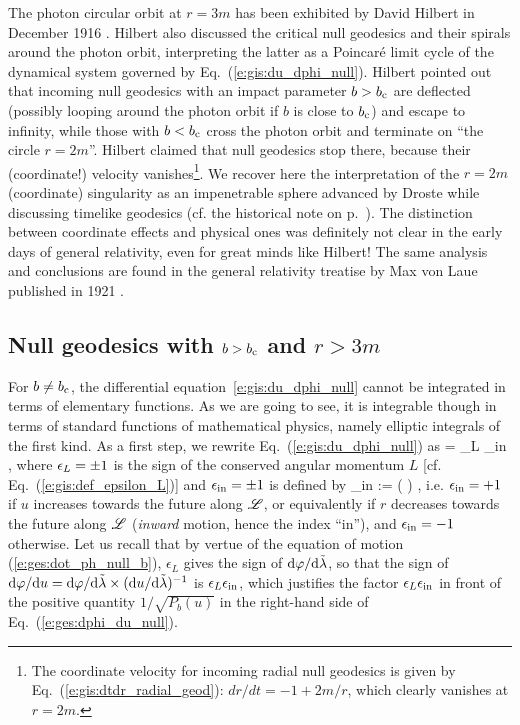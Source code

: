 \begin{hist}
The photon circular orbit at $r=3m$ has been exhibited by David Hilbert
in December 1916 \cite{Hilbe1917a,Hilbe1917b}. Hilbert also discussed the
critical null geodesics and their spirals
around the photon orbit, interpreting the latter as a Poincaré limit cycle
of the dynamical system governed by Eq.~(\ref{e:gis:du_dphi_null}).
Hilbert pointed out that incoming null geodesics with an impact parameter
$b > b_{\rm c}$ are deflected (possibly looping
around the photon orbit if $b$ is close to $b_{\rm c}$) and escape to infinity,
while those with $b < b_{\rm c}$ cross the photon orbit and terminate on ``the circle
$r=2m$''. Hilbert claimed that null geodesics stop there, because
their (coordinate!) velocity vanishes\footnote{The coordinate velocity for
incoming radial null geodesics is given by Eq.~(\ref{e:gis:dtdr_radial_geod}):
$dr/dt = - 1 + 2m/r$, which clearly vanishes at $r=2m$.}. We recover here the interpretation
of the $r=2m$ (coordinate) singularity as an impenetrable sphere advanced by Droste while discussing
timelike geodesics (cf. the historical note on p.~\pageref{h:ges:geod}). The distinction
between coordinate effects and physical ones was definitely not clear in the early
days of general relativity, even for great minds like Hilbert!
The same analysis and conclusions are found in the general relativity treatise
by Max von Laue published in 1921 \cite{Laue1921}.
\end{hist}

\subsection{Null geodesics with $b > b_{\rm c}$ and $r> 3m$} \label{s:gis:geod_b_gt_bc_out}

For $b \not= b_{\rm c}$, the differential equation~\eqref{e:gis:du_dphi_null} cannot be integrated
in terms of elementary functions. As we are going to see, it is integrable
though in terms of standard
functions of mathematical physics, namely elliptic integrals of the first kind.
As a first step, we rewrite Eq.~(\ref{e:gis:du_dphi_null}) as
\be \label{e:ges:dphi_du_null}
    = \eps_L \eps_{\rm in}   ,
\ee
where $\epsilon_L = \pm 1$ is the sign of the conserved angular momentum $L$
[cf. Eq.~(\ref{e:gis:def_epsilon_L})] and $\epsilon_{\rm in} = \pm 1$ is
defined by
\be
    \eps_{\rm in} :=  \left(  \right) ,
\ee
i.e. $\epsilon_{\rm in} = +1$ if $u$ increases towards the future along $\mathscr{L}$, or equivalently
if $r$ decreases towards the future along $\mathscr{L}$ (\emph{inward} motion, hence the index ``in''),
and $\epsilon_{\rm in} = -1$ otherwise.
Let us recall that by vertue of the equation of motion (\ref{e:ges:dot_ph_null_b}),
$\epsilon_L$ gives the sign of $\mathrm{d}\varphi/\mathrm{d}{\tilde\lambda}$, so that the sign of
$\mathrm{d}\varphi/\mathrm{d} u = \mathrm{d}\varphi/\mathrm{d}{\tilde\lambda} \times (\mathrm{d} u/\mathrm{d}{\tilde\lambda})^{-1}$ is $\epsilon_L \epsilon_{\rm in}$,
which justifies the factor $\epsilon_L \epsilon_{\rm in}$ in front of the positive
quantity $1/\sqrt{P_b(u)}$ in the right-hand side of Eq.~(\ref{e:ges:dphi_du_null}).

